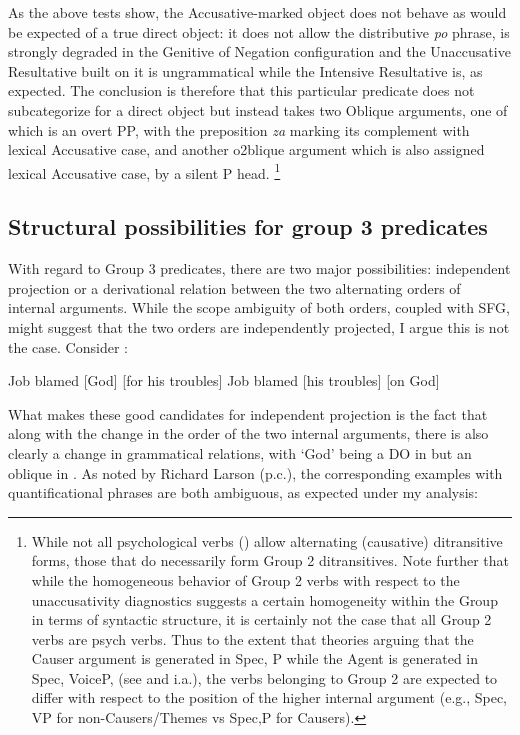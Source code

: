 \documentclass[output=paper,colorlinks,citecolor=brown,modfonts,nonflat]{langsci/langscibook}
\begin{document}
As the above tests show, the Accusative-marked object does not behave as would be expected of a true direct object: it does not allow the distributive \textit{po} phrase, is strongly degraded in the Genitive of Negation configuration and the Unaccusative Resultative built on it is ungrammatical while the Intensive Resultative is, as expected. The conclusion is therefore that this particular predicate does not subcategorize for a direct object but instead takes two Oblique arguments, one of which is an overt PP, with the preposition \textit{za} marking its complement with lexical Accusative case, and another o2blique argument which is also assigned lexical Accusative case, by a silent P head.
\footnote{%
While not all psychological verbs (\citealt{BellettiRizzi1988}) allow alternating (causative) ditransitive forms, those that do necessarily form Group 2 ditransitives. Note further that while the homogeneous behavior of Group 2 verbs with respect to the unaccusativity diagnostics suggests a certain homogeneity within the Group in terms of syntactic structure, it is certainly not the case that all Group 2 verbs are psych verbs. Thus to the extent that theories arguing that the Causer argument is generated in Spec, {\liv}P while the Agent is generated in Spec, VoiceP, (see \citealt{Kratzer2005} and \citealt{AlexiadouEtAl2006} i.a.), the verbs belonging to Group 2 are expected to differ with respect to the position of the higher internal argument (e.g., Spec, VP for non-Causers/Themes vs Spec,{\liv}P for Causers).}

\subsection{Structural possibilities for group 3 predicates}\label{sec:antonyuk:4.3}

With regard to Group 3 predicates, there are two major possibilities: independent projection or a derivational relation between the two alternating orders of internal arguments. While the scope ambiguity of both orders, coupled with SFG, might suggest that the two orders are independently projected, I argue this is not the case. Consider :


\ea%
    \label{ex:antonyuk:56}
    \ea \label{ex:antonyuk:56a}
    Job blamed [God] [for his troubles] \hfill \citep{Larson1990}
    \ex \label{ex:antonyuk:56b}
    Job blamed [his troubles] [on God]
    \z
\z

What makes these good candidates for independent projection is the fact that along with the change in the order of the two internal arguments, there is also clearly a change in grammatical relations, with ‘God’ being a DO in  but an oblique in . As noted by Richard Larson (p.c.), the corresponding examples with quantificational phrases are both ambiguous, as expected under my analysis:
\end{document}
